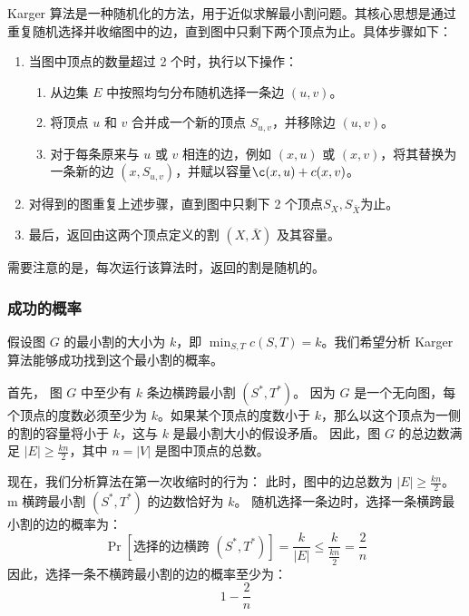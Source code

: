 \documentclass[lang=cn,newtx,10pt,scheme=chinese,chinesefont=nofont,citestyle=gb7714-2015, bibstyle=gb7714-2015]{elegantbook}
\begin{document}
\begin{refsection}
Karger 算法\cite{karger1993n2}是一种随机化的方法，用于近似求解最小割问题。其核心思想是通过重复随机选择并收缩图中的边，直到图中只剩下两个顶点为止。具体步骤如下：

\begin{enumerate}
    \item 当图中顶点的数量超过 2 个时，执行以下操作：
    \begin{enumerate}
        \item 从边集 \( E \) 中按照均匀分布随机选择一条边 \( (u, v) \)。
        \item 将顶点 \( u \) 和 \( v \) 合并成一个新的顶点 \( S_{u,v} \)，并移除边 \( (u, v) \)。
        \item 对于每条原来与 \( u \) 或 \( v \) 相连的边，例如 \( (x, u) \) 或 \( (x, v) \)，将其替换为一条新的边 \( (x, S_{u,v}) \)，并赋以容量$\c(x,u)+c(x,v)$。
    \end{enumerate}
    \item 对得到的图重复上述步骤，直到图中只剩下 2 个顶点$S_X, S_{\bar X}$为止。
    \item 最后，返回由这两个顶点定义的割 \( (X, \bar X) \) 及其容量。
\end{enumerate}

需要注意的是，每次运行该算法时，返回的割是随机的。

\subsubsection{成功的概率}

假设图 \( G \) 的最小割的大小为 \( k \)，即 \( \min_{S,T} c(S, T) = k \)。我们希望分析 Karger 算法能够成功找到这个最小割的概率。

首先， 图 \( G \) 中至少有 \( k \) 条边横跨最小割 \( (S^*, T^*) \)。
    因为 \( G \) 是一个无向图，每个顶点的度数必须至少为 \( k \)。如果某个顶点的度数小于 \( k \)，那么以这个顶点为一侧的割的容量将小于 \( k \)，这与 \( k \) 是最小割大小的假设矛盾。
因此，图 \( G \) 的总边数满足 \( |E| \geq \frac{k n}{2} \)，其中 \( n = |V| \) 是图中顶点的总数。


现在，我们分析算法在第一次收缩时的行为：
 此时，图中的边总数为 \( |E| \geq \frac{k n}{2} \)。
m 横跨最小割 \( (S^*, T^*) \) 的边数恰好为 \( k \)。
随机选择一条边时，选择一条横跨最小割的边的概率为：
    \[
    \Pr[\text{选择的边横跨 } (S^*, T^*)] = \frac{k}{|E|} \leq \frac{k}{\frac{k n}{2}} = \frac{2}{n}
    \]
  因此，选择一条不横跨最小割的边的概率至少为：
    \[
    1 - \frac{2}{n}
    \]


\end{refsection}
\end{document}
